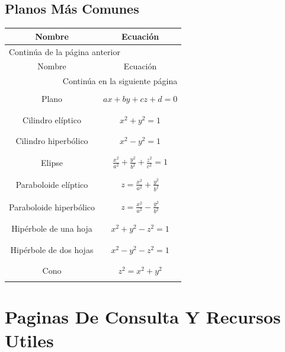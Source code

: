 \documentclass{article}
\begin{document}
\subsection{Planos Más Comunes}
\label{sec:orgd01790e}
\begin{longtable}{|c|c|}
\hline
Nombre & Ecuación\\
\hline
\endfirsthead
\multicolumn{2}{l}{Continúa de la página anterior} \\
\hline

Nombre & Ecuación \\

\hline
\endhead
\hline\multicolumn{2}{r}{Continúa en la siguiente página} \\
\endfoot
\endlastfoot
\hline
 & \\
Plano & \(ax+by+cz+d=0\)\\
 & \\
\hline
 & \\
Cilindro elíptico & \(x^2+y^2=1\)\\
 & \\
\hline
 & \\
Cilindro hiperbólico & \(x^2-y^2=1\)\\
 & \\
\hline
 & \\
Elipse & \(\frac{x^2}{a^2}+\frac{y^2}{b^2}+\frac{z^2}{c^2}=1\)\\
 & \\
\hline
 & \\
Paraboloide elíptico & \(z=\frac{x^2}{a^2}+\frac{y^2}{b^2}\)\\
 & \\
\hline
 & \\
Paraboloide hiperbólico & \(z=\frac{x^2}{a^2}-\frac{y^2}{b^2}\)\\
 & \\
\hline
 & \\
Hipérbole de una hoja & \(x^2 + y^2 - z^2 = 1\)\\
 & \\
\hline
 & \\
Hipérbole de dos hojas & \(x^2 - y^2 - z^2 = 1\)\\
 & \\
\hline
 & \\
Cono & \(z^2 = x^2 + y^2\)\\
 & \\
\hline
\end{longtable}

\section{Paginas De Consulta Y Recursos Utiles}
\label{sec:org019f942}
\end{document}
